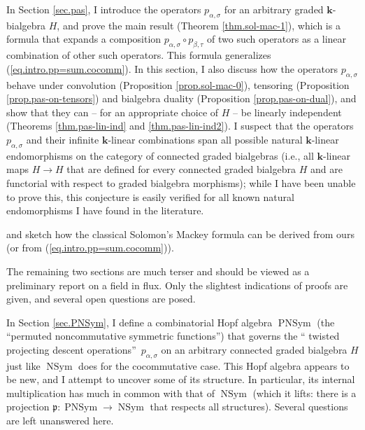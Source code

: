 \documentclass[numbers=enddot,12pt,final,onecolumn,notitlepage]{scrartcl}%
\theoremstyle{definition}
\newenvironment{noncompile}{}{}
\begin{document}
In Section \ref{sec.pas}, I introduce the operators $p_{\alpha,\sigma}$ for an
arbitrary graded $\mathbf{k}$-bialgebra $H$, and prove the main result
(Theorem \ref{thm.sol-mac-1}), which is a formula that expands a composition
$p_{\alpha,\sigma}\circ p_{\beta,\tau}$ of two such operators as a linear
combination of other such operators. This formula generalizes
(\ref{eq.intro.pp=sum.cocomm}). In this section, I also discuss how the
operators $p_{\alpha,\sigma}$ behave under convolution (Proposition
\ref{prop.sol-mac-0}), tensoring (Proposition \ref{prop.pas-on-tensors}) and
bialgebra duality (Proposition \ref{prop.pas-on-dual}), and show that they can
-- for an appropriate choice of $H$ -- be linearly independent (Theorems
\ref{thm.pas-lin-ind} and \ref{thm.pas-lin-ind2}). I suspect that the
operators $p_{\alpha,\sigma}$ and their infinite $\mathbf{k}$-linear
combinations span all possible natural $\mathbf{k}$-linear endomorphisms on
the category of connected graded bialgebras (i.e., all $\mathbf{k}$-linear
maps $H\rightarrow H$ that are defined for every connected graded bialgebra
$H$ and are functorial with respect to graded bialgebra morphisms); while I
have been unable to prove this, this conjecture is easily verified for all
known natural endomorphisms I have found in the literature.

\begin{noncompile}
and sketch how the classical Solomon's Mackey formula can be derived from ours
(or from (\ref{eq.intro.pp=sum.cocomm})).
\end{noncompile}

The remaining two sections are much terser and should be viewed as a
preliminary report on a field in flux. Only the slightest indications of
proofs are given, and several open questions are posed.

In Section \ref{sec.PNSym}, I define a combinatorial Hopf algebra
$\operatorname*{PNSym}$ (the \textquotedblleft permuted noncommutative
symmetric functions\textquotedblright) that governs the \textquotedblleft
twisted projecting descent operations\textquotedblright\ $p_{\alpha,\sigma}$
on an arbitrary connected graded bialgebra $H$ just like $\operatorname*{NSym}%
$ does for the cocommutative case. This Hopf algebra appears to be new, and I
attempt to uncover some of its structure. In particular, its internal
multiplication has much in common with that of $\operatorname*{NSym}$ (which
it lifts: there is a projection $\mathfrak{p}:\operatorname*{PNSym}%
\rightarrow\operatorname*{NSym}$ that respects all structures). Several
questions are left unanswered here.
\end{document}

